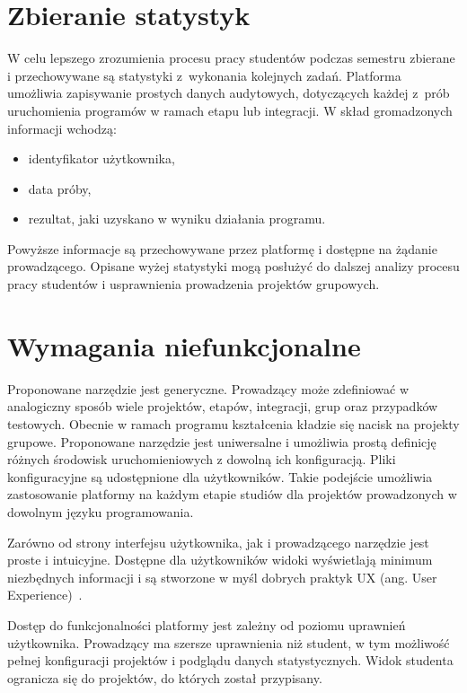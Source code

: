 \section{Zbieranie statystyk}

W celu lepszego zrozumienia procesu pracy studentów podczas semestru zbierane i przechowywane są statystyki z~wykonania kolejnych zadań.
Platforma umożliwia zapisywanie prostych danych audytowych, dotyczących każdej z~prób uruchomienia programów w ramach etapu lub integracji.
W skład gromadzonych informacji wchodzą:
\begin{itemize}
    \item identyfikator użytkownika,
    \item data próby,
    \item rezultat, jaki uzyskano w wyniku działania programu.
\end{itemize}
Powyższe informacje są przechowywane przez platformę i dostępne na żądanie prowadzącego.
Opisane wyżej statystyki mogą posłużyć do dalszej analizy procesu pracy studentów i usprawnienia prowadzenia projektów grupowych.


\section{Wymagania niefunkcjonalne}

Proponowane narzędzie jest generyczne.
Prowadzący może zdefiniować w analogiczny sposób wiele projektów, etapów, integracji, grup oraz przypadków testowych.
Obecnie w ramach programu kształcenia kładzie się nacisk na projekty grupowe.
Proponowane narzędzie jest uniwersalne i umożliwia prostą definicję różnych środowisk uruchomieniowych z dowolną ich konfiguracją.
Pliki konfiguracyjne są udostępnione dla użytkowników.
Takie podejście umożliwia zastosowanie platformy na każdym etapie studiów dla projektów prowadzonych w dowolnym języku programowania.

Zarówno od strony interfejsu użytkownika, jak i prowadzącego narzędzie jest proste i intuicyjne.
Dostępne dla użytkowników widoki wyświetlają minimum niezbędnych informacji i są stworzone w myśl dobrych praktyk UX (ang. User Experience)~\cite{ux-good-practicies}.

Dostęp do funkcjonalności platformy jest zależny od poziomu uprawnień użytkownika.
Prowadzący ma szersze uprawnienia niż student, w tym możliwość pełnej konfiguracji projektów i podglądu danych statystycznych.
Widok studenta ogranicza się do projektów, do których został przypisany.

